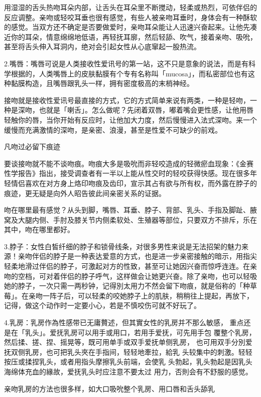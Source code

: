 \documentclass[12pt,UTF8]{ctexbook}
\begin{document}
用湿湿的舌头热吻耳朵内部，让舌头在耳朵里不断搅动，轻柔或热烈，可依伴侣的反应调整。亲吻或轻咬耳垂也很有感觉，有些人被亲吻耳垂时，身体会有一种酥软的感觉。当双方还不确定是否要做爱时，亲吻耳朵能让人迅速兴奋起来。让他先凑近你的耳朵，情意绵绵地低语，再轻抚耳廓，然后轻舔、吹气，接着亲吻、吸吮，甚至将舌头伸入耳洞内，绝对会引起女性从心底窜起一股热流。

2.嘴唇：嘴唇可说是人类接收性爱讯号的第一站，这不只是意象的说法，而是有科学根据的，人类嘴唇上的皮肤黏膜有个专有名称叫「mucosa」，而私密部位也有这种黏膜构造，且嘴唇跟乳头一样，拥有密度极高的末梢神经。

接吻就是接收性爱讯号最直接的方式，它的方式简单来说有两类，一种是轻吻，一种是深吻，也就是「喇舌」。怎么做呢？先闭着双唇，嘟着嘴会更性感，让他用唇轻触你的唇，当你开始有反应时，让他加大力度，然后慢慢进入法式深吻。来一个缓慢而充满激情的深吻，是亲密、浪漫，甚至是性爱不可缺少的前戏。

凡吻过必留下痕迹

要谈接吻就不能不谈吻痕。吻痕大多是吸吮而非轻咬造成的轻微瘀血现象：《金赛性学报告》指出，接受调查者有一半以上能从性交时的轻咬获得快感。现在很多年轻情侣喜欢在对方身上烙印吻痕及齿印，宣示其占有欲与所有权，而外露在脖子的痕迹，更无疑是向外人昭告彼此间亲密关系的证据。

吻在哪里最有感觉？从头到脚，嘴唇、耳垂、脖子、背部、乳头、手指及脚趾、腋窝及大腿内侧、手肘及膝关节内侧柔软处、生殖器等部位，只要双方不排斥，乐在其中，吻在哪里都好。

3.脖子：女性白皙纤细的脖子和锁骨线条，对很多男性来说是无法招架的魅力来源！亲吻伴侣的脖子是一种表达爱意的方式，也是进一步亲密接触的暗示，用指尖轻柔地滑过伴侣的脖子，可激起对方的性致，甚至可让她因兴奋而惊呼连连。在亲吻的空档，可对着伴侣的脖子呼气，这样做会让她更兴奋。除了亲吻，也可以轻吸她的脖子，一次只需一两秒钟，记得別太用力不然会留下吻痕，就是俗称的「种草莓」。在亲吻一阵子后，可以轻柔的咬她脖子上的肌肤，稍稍往上提起，再放下，记得，做这个动作时一定要小心，若是不慎咬伤可就不好玩了。

4.乳房：乳房作為性感带已无庸贅述，但其實女性的乳房并不那么敏感，
重点还是在「乳头」。爱抚乳房可以用手或用口，若用手爱抚，可先用手包
覆整个乳房，然后揉、搓、捏、摇晃等，既可用单手或双手爱抚单侧乳房，
也可用双手分別爱抚双侧乳房，也可把乳头夾在手指间，轻轻地牽拉，給乳
头较集中的刺激。轻轻按压或揉捏乳头，或者用指头摩擦乳头前端，会使乳
头勃起，乳头勃起是因乳头海绵体充血的緣故，爱抚乳头时应注意不要太过
用力，否則会有不舒服的感觉。

亲吻乳房的方法也很多样，如大口吸吮整个乳房、用口唇和舌头舔乳
\end{document}
